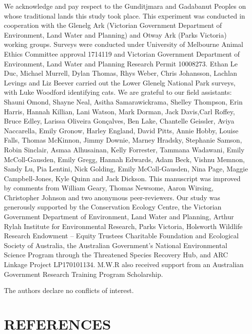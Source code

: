 \documentclass[preprint, 3p, authoryear]{elsarticle} %
\begin{document}
We acknowledge and pay respect to the Gunditjmara and Gadabanut Peoples on whose traditional lands this study took place. This experiment was conducted in cooperation with the Glenelg Ark (Victorian Government Department of Environment, Land Water and Planning) and Otway Ark (Parks Victoria) working groups. Surveys were conducted under University of Melbourne Animal Ethics Committee approval 1714119 and Victorian Government Department of Environment, Land Water and Planning Research Permit 10008273. Ethan Le Duc, Michael Murrell, Dylan Thomas, Rhys Weber, Chris Johansson, Lachlan Levings and Liz Beever carried out the Lower Glenelg National Park surveys, with Luke Woodford identifying cats. We are grateful to our field assistants: Shauni Omond, Shayne Neal, Asitha Samarawickrama, Shelley Thompson, Erin Harris, Hannah Killian, Lani Watson, Mark Dorman, Jack Davis,Carl Roffey, Bruce Edley, Larissa Oliveira Gonçalves, Ben Lake, Chantelle Geissler, Aviya Naccarella, Emily Gronow, Harley England, David Pitts, Annie Hobby, Louise Falls, Thomas McKinnon, Jimmy Downie, Marney Hradsky, Stephanie Samson, Robin Sinclair, Asmaa Alhusainan, Kelly Forrester, Tammana Wadawani, Emily McColl-Gausden, Emily Gregg, Hannah Edwards, Adam Beck, Vishnu Memnon, Sandy Lu, Pia Lentini, Nick Golding, Emily McColl-Gausden, Nina Page, Maggie Campbell-Jones, Kyle Quinn and Jack Dickson. This manuscript was improved by comments from William Geary, Thomas Newsome, Aaron Wirsing, Christopher Johnson and two anonymous peer-reviewers. Our study was generously supported by the Conservation Ecology Centre, the Victorian Government Department of Environment, Land Water and Planning, Arthur Rylah Institute for Environmental Research, Parks Victoria, Holsworth Wildlife Research Endowment -- Equity Trustees Charitable Foundation and Ecological Society of Australia, the Australian Government's National Environmental Science Program through the Threatened Species Recovery Hub, and ARC Linkage Project LP170101134. M.W.R also received support from an Australian Government Research Training Program Scholarship.

The authors declare no conflicts of interest.

\newpage

\hypertarget{references}{%
\section*{REFERENCES}\label{references}}
\end{document}
